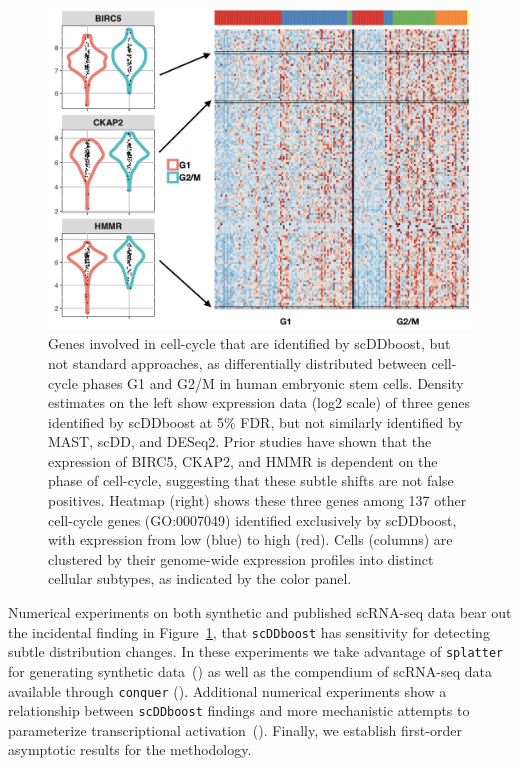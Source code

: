 \documentclass[aoas,preprint]{imsart}
\begin{document}
\begin{figure}[H]
\includegraphics[width=\textwidth]{Figs/Fig1.png}

 \caption{Genes involved in cell-cycle that are identified by scDDboost, but not standard approaches,
 as differentially distributed between cell-cycle phases G1 and G2/M in human embryonic stem cells. 
  Density estimates on the left show expression data (log2 scale)
of three genes identified by scDDboost at 5\% FDR, but not similarly identified by MAST, scDD, and DESeq2.
 Prior studies have shown that the expression
 of  BIRC5, CKAP2, and HMMR is dependent on the phase of cell-cycle,
 suggesting that these subtle shifts are not false positives. 
 Heatmap (right) shows these three genes among 137 other cell-cycle genes (GO:0007049) identified
exclusively by scDDboost, with expression from low (blue) to high 
(red).  Cells (columns) are clustered by their genome-wide
expression profiles into distinct cellular subtypes, as indicated by the color panel.}


 \label{fig:whet} 
\end{figure}


Numerical experiments on both synthetic and published scRNA-seq data bear out the incidental finding 
in Figure~\ref{fig:whet}, that \verb+scDDboost+ has sensitivity for detecting subtle distribution changes. 
  In these experiments we take advantage of
\verb+splatter+ for generating synthetic data~(\cite{ref:Zappia}) as well as the compendium of scRNA-seq
data available through \verb+conquer+ (\cite{ref:Cq}).  Additional numerical experiments show a relationship
 between \verb+scDDboost+ findings and more mechanistic attempts to parameterize transcriptional
 activation~(\cite{ref:d3e}).  Finally, we establish first-order asymptotic results for the methodology.  
\end{document}

